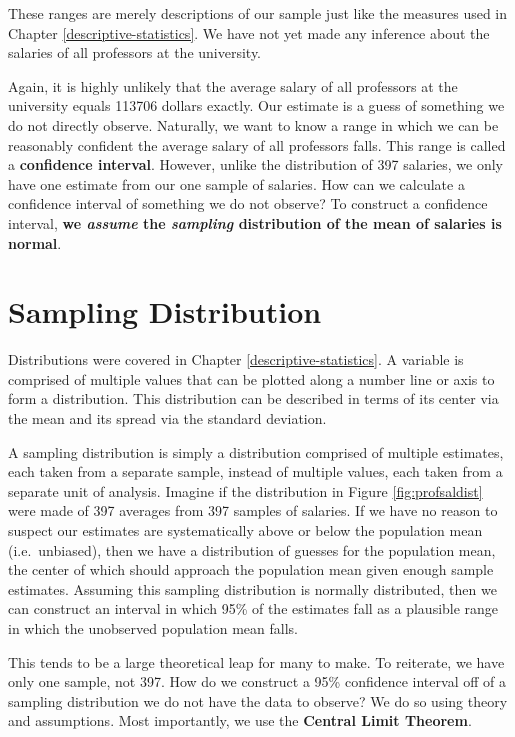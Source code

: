 \documentclass[
]{book}
\begin{document}
These ranges are merely descriptions of our sample just like the measures used in Chapter \ref{descriptive-statistics}. We have not yet made any inference about the salaries of all professors at the university.

Again, it is highly unlikely that the average salary of all professors at the university equals 113706 dollars exactly. Our estimate is a guess of something we do not directly observe. Naturally, we want to know a range in which we can be reasonably confident the average salary of all professors falls. This range is called a \textbf{confidence interval}. However, unlike the distribution of 397 salaries, we only have one estimate from our one sample of salaries. How can we calculate a confidence interval of something we do not observe? To construct a confidence interval, \textbf{we \emph{assume} the \emph{sampling} distribution of the mean of salaries is normal}.

\hypertarget{sampling-distribution}{%
\section{Sampling Distribution}\label{sampling-distribution}}

Distributions were covered in Chapter \ref{descriptive-statistics}. A variable is comprised of multiple values that can be plotted along a number line or axis to form a distribution. This distribution can be described in terms of its center via the mean and its spread via the standard deviation.

A sampling distribution is simply a distribution comprised of multiple estimates, each taken from a separate sample, instead of multiple values, each taken from a separate unit of analysis. Imagine if the distribution in Figure \ref{fig:profsaldist} were made of 397 averages from 397 samples of salaries. If we have no reason to suspect our estimates are systematically above or below the population mean (i.e.~unbiased), then we have a distribution of guesses for the population mean, the center of which should approach the population mean given enough sample estimates. Assuming this sampling distribution is normally distributed, then we can construct an interval in which 95\% of the estimates fall as a plausible range in which the unobserved population mean falls.

This tends to be a large theoretical leap for many to make. To reiterate, we have only one sample, not 397. How do we construct a 95\% confidence interval off of a sampling distribution we do not have the data to observe? We do so using theory and assumptions. Most importantly, we use the \textbf{Central Limit Theorem}.
\end{document}
